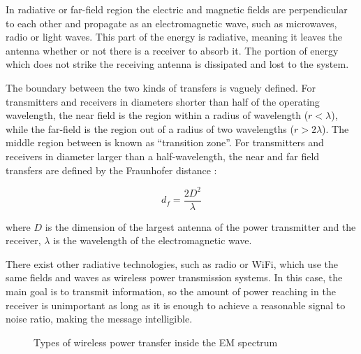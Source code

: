 In radiative or far-field region the electric and magnetic fields are perpendicular to each other and propagate as an electromagnetic wave, such as microwaves, radio or light waves. This part of the energy is radiative, meaning it leaves the antenna whether or not there is a receiver to absorb it. The portion of energy which does not strike the receiving antenna is dissipated and lost to the system.

The boundary between the two kinds of transfers is vaguely defined. For transmitters and receivers in diameters shorter than half of the operating wavelength, the near field is the region within a radius of wavelength ($r<\lambda$), while the far-field is the region out of a radius of two wavelengths ($r>2\lambda$). The middle region between is known as ``transition zone''. For transmitters and receivers in diameter larger than a half-wavelength, the near and far field transfers are defined by the Fraunhofer distance \cite{Balanis}:

  \begin{equation} %
    d_f = \frac{2D^2}{\lambda}
  \end{equation}

where $D$ is the dimension of the largest antenna of the power transmitter and the receiver, $\lambda$ is the wavelength of the electromagnetic wave. 

There exist other radiative technologies, such as radio or WiFi, which use the same fields and waves as wireless power transmission systems. In this case, the main goal is to transmit information, so the amount of power reaching in the receiver is unimportant as long as it is enough to achieve a reasonable signal to noise ratio, making the message intelligible.

\hfill \break
\begin{figure}[hb]
\caption{Types of wireless power transfer inside the EM spectrum}
\label{fig:classification}
\end{figure}

